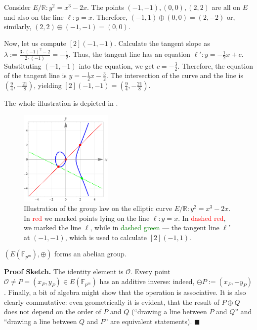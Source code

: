 \documentclass[../lecture-notes.tex]{subfiles}
\begin{document}
\begin{example}
    Consider $E/\mathbb{R}: y^2=x^3-2x$. The points $(-1,-1),(0,0),(2,2)$ are all on $E$ and also on the line $\ell: y=x$. Therefore, $(-1,1) \oplus (0,0) = (2,-2)$ or, similarly, $(2,2) \oplus (-1,-1) = (0,0)$.

    Now, let us compute $[2](-1,-1)$. Calculate the tangent slope as $\lambda := \frac{3\cdot(-1)^2 - 2}{2\cdot(-1)} = -\frac{1}{2}$. Thus, the tangent line has an equation $\ell': y = -\frac{1}{2}x+c$. Substituting $(-1,-1)$ into the equation, we get $c=-\frac{3}{2}$. Therefore, the equation of the tangent line is $y=-\frac{1}{2}x-\frac{3}{2}$. The intersection of the curve and the line is $\left(\frac{9}{4},-\frac{21}{8}\right)$, yielding $[2](-1,-1) = \left(\frac{9}{4},-\frac{21}{8}\right)$.

    The whole illustration is depicted in .

    \begin{figure}[H]
        \centering
        \includegraphics[width=0.4\textwidth]{images/lecture_3/ec_illustration_2.pdf}
        \caption{Illustration of the group law on the elliptic curve $E/\mathbb{R}: y^2=x^3-2x$. In \textcolor{red}{red} we marked points lying on the line $\ell: y=x$. In \textcolor{red}{dashed red}, we marked the line $\ell$, while in \textcolor{green}{dashed green} --- the tangent line $\ell'$ at $(-1,-1)$, which is used to calculate $[2](-1,1)$.}
        \label{fig:ec_2}
    \end{figure}
\end{example}

\begin{theorem}
    $(E(\mathbb{F}_{p^m}),\oplus)$ forms an abelian group.
\end{theorem}

\textbf{Proof Sketch.} The identity element is $\mathcal{O}$. Every point $\mathcal{O} \neq P=(x_P,y_P) \in E(\mathbb{F}_{p^m})$ has an additive inverse: indeed, $\ominus P := (x_P,-y_P)$. Finally, a bit of algebra might show that the operation is associative. It is also clearly commutative: even geometrically it is evident, that the result of $P\oplus Q$ does not depend on the order of $P$ and $Q$ (``drawing a line between $P$ and $Q$'' and ``drawing a line between $Q$ and $P$'' are equivalent statements). $\blacksquare$
\end{document}
